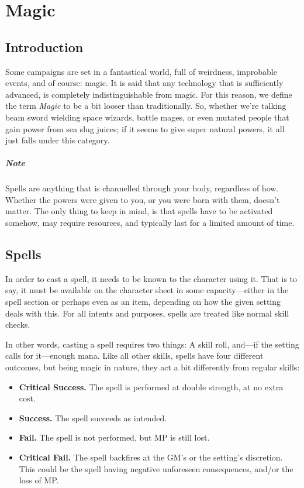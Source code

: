 \chapter{Magic} \label{chap:magic}
\section{Introduction}
Some campaigns are set in a fantastical world, full of weirdness, improbable events, and of course: magic.
It is said that any technology that is sufficiently advanced, is completely indistinguishable from magic.
For this reason, we define the term \textit{Magic} to be a bit looser than traditionally.
So, whether we're talking beam sword wielding space wizards, battle mages, or even mutated people that gain power from sea slug juices;
if it seems to give super natural powers, it all just falls under this category.

\paragraph{Note} Spells are anything that is channelled through your body, regardless of how.
Whether the powers were given to you, or you were born with them, doesn't matter.
The only thing to keep in mind, is that spells have to be activated somehow, may require resources, and typically last for a limited amount of time.

\section{Spells}
In order to cast a spell, it needs to be known to the character using it.
That is to say, it must be available on the character sheet in some capacity---either in the spell section or perhaps even as an item, depending on how the given setting deals with this.
For all intents and purposes, spells are treated like normal skill checks.

In other words, casting a spell requires two things: A skill roll, and---if the setting calls for it---enough mana.
Like all other skills, spells have four different outcomes, but being magic in nature, they act a bit differently from regular skills:
\begin{itemize}
  \item \textbf{Critical Success.} The spell is performed at double strength, at no extra cost.
  \item \textbf{Success.} The spell succeeds as intended.
  \item \textbf{Fail.} The spell is not performed, but MP is still lost.
  \item \textbf{Critical Fail.} The spell backfires at the GM's or the setting's discretion.
\\This could be the spell having negative unforeseen consequences, and/or the loss of MP.
\end{itemize}

